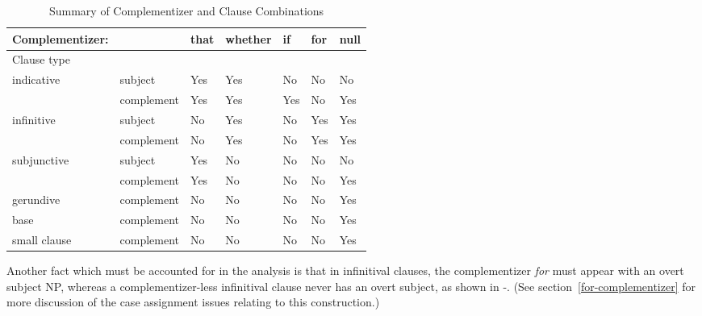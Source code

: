 

\begin{table}[ht]
\centering
\begin{tabular}{|l|llllll|} \hline
Complementizer:&&that&whether&if&for&null\\
\hline
Clause type&&&&&&\\
\hline
indicative&subject&Yes&Yes&No&No&No\\
&complement&Yes&Yes&Yes&No&Yes\\
\hline
infinitive&subject&No&Yes&No&Yes&Yes\\
&complement&No&Yes&No&Yes&Yes\\
\hline
subjunctive&subject&Yes&No&No&No&No\\
&complement&Yes&No&No&No&Yes\\
\hline
gerundive\footnotemark\ &complement&No&No&No&No&Yes\\
\hline
base & complement & No & No & No & No & Yes \\
\hline
small clause & complement & No & No & No & No & Yes \\
\hline
\end{tabular}
\vspace{.2in}
\caption{Summary of Complementizer and Clause Combinations}
\label{facts}
\end{table}


Another fact which must be accounted for in the analysis is that in infinitival
clauses, the complementizer {\it for} must appear with an overt subject NP,
whereas a complementizer-less infinitival clause never has an overt subject, as
shown in -. (See section~\ref{for-complementizer} for more
discussion of the case assignment issues relating to this construction.)



